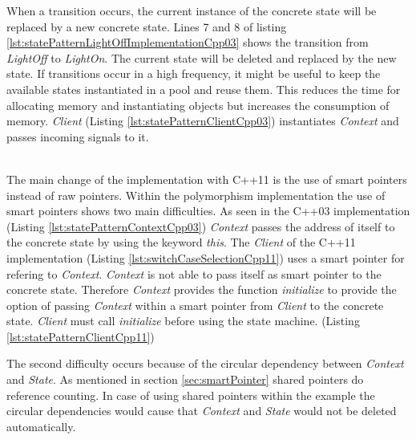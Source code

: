 {\FloatBarrier

\FloatBarrier

\noindent When a transition occurs, the current instance of the concrete state will be replaced by a new concrete state. Lines 7 and 8 of listing \ref{lst:statePatternLightOffImplementationCpp03} shows the transition from \emph{LightOff} to \emph{LightOn}. The current state will be deleted and replaced by the new state. If transitions occur in a high frequency, it might be useful to keep the available states instantiated in a pool and reuse them. This reduces the time for allocating memory and instantiating objects but increases the consumption of memory. \emph{Client} (Listing \ref{lst:statePatternClientCpp03}) instantiates \emph{Context} and passes incoming signals to it. 

\noindent\\ The main change of the implementation with C++11 is the use of smart pointers instead of raw pointers. Within the polymorphism implementation the use of smart pointers shows two main difficulties. As seen in the C++03 implementation (Listing \ref{lst:statePatternContextCpp03}) \emph{Context} passes the address of itself to the concrete state by using the keyword \emph{this}. The \emph{Client} of the C++11 implementation (Listing \ref{lst:switchCaseSelectionCpp11}) uses a smart pointer for refering to \emph{Context}. \emph{Context} is not able to pass itself as smart pointer to the concrete state. Therefore \emph{Context} provides the function \emph{initialize} to provide the option of passing \emph{Context} within a smart pointer from \emph{Client} to the concrete state. \emph{Client} must call \emph{initialize} before using the state machine. (Listing \ref{lst:statePatternClientCpp11})



\FloatBarrier


\noindent The second difficulty occurs because of the circular dependency between \emph{Context} and \emph{State}. As mentioned in section \ref{sec:smartPointer} shared pointers do reference counting. In case of using shared pointers within the example the circular dependencies would cause that \emph{Context} and \emph{State} would not be deleted automatically. 

}
